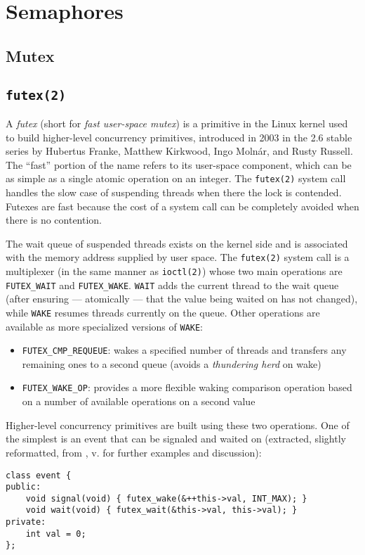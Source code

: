 \section{Semaphores}

\subsection{Mutex}

\label{subsec:conc:mutex}

\subsection{\texttt{futex(2)}}

A \textit{futex} (short for \textit{fast user-space mutex}) is a primitive in
the Linux kernel used to build higher-level concurrency primitives, introduced
in 2003 in the 2.6 stable series by Hubertus Franke, Matthew Kirkwood, Ingo
Molnár, and Rusty Russell.  The ``fast'' portion of the name refers to its
user-space component, which can be as simple as a single atomic operation on an
integer.  The \texttt{futex(2)} system call handles the slow case of suspending
threads when there the lock is contended.  Futexes are fast because the cost of
a system call can be completely avoided when there is no
contention.\footnotemark


The wait queue of suspended threads exists on the kernel side and is associated
with the memory address supplied by user space.  The \texttt{futex(2)} system
call is a multiplexer (in the same manner as \texttt{ioctl(2)}) whose two main
operations are \texttt{FUTEX\_WAIT} and \texttt{FUTEX\_WAKE}.  \texttt{WAIT}
adds the current thread to the wait queue (after ensuring --- atomically ---
that the value being waited on has not changed), while \texttt{WAKE} resumes
threads currently on the queue.  Other operations are available as more
specialized versions of \texttt{WAKE}:

\begin{itemize}
    \item \texttt{FUTEX\_CMP\_REQUEUE}:
        wakes a specified number of threads and transfers any remaining ones to
        a second queue (avoids a \textit{thundering herd} on wake)
    \item \texttt{FUTEX\_WAKE\_OP}:
        provides a more flexible waking comparison operation based on a number
        of available operations on a second value
\end{itemize}

Higher-level concurrency primitives are built using these two operations.  One
of the simplest is an event that can be signaled and waited on (extracted,
slightly reformatted, from \cite{Drepper2011}, v. for further examples and
discussion):

\begin{lstlisting}[style=c++]
class event {
public:
    void signal(void) { futex_wake(&++this->val, INT_MAX); }
    void wait(void) { futex_wait(&this->val, this->val); }
private:
    int val = 0;
};
\end{lstlisting}
